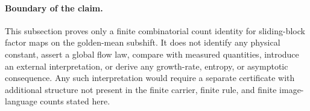 \paragraph{Boundary of the claim.}
This subsection proves only a finite combinatorial count identity for sliding-block factor maps on the golden-mean subshift. It does not identify any physical constant, assert a global flow law, compare with measured quantities, introduce an external interpretation, or derive any growth-rate, entropy, or asymptotic consequence. Any such interpretation would require a separate certificate with additional structure not present in the finite carrier, finite rule, and finite image-language counts stated here.
